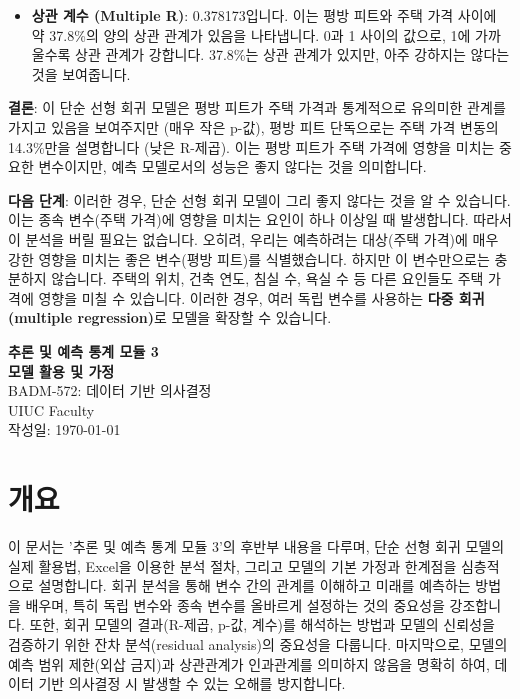 \documentclass[11pt,a4paper]{article}
\begin{document}
\begin{tcolorbox}[examplebox, title=Excel 실습: Zillow 주택 데이터]
\begin{itemize}
    \item \textbf{상관 계수 (Multiple R)}: 0.378173입니다. 이는 평방 피트와 주택 가격 사이에 약 37.8\%의 양의 상관 관계가 있음을 나타냅니다. 0과 1 사이의 값으로, 1에 가까울수록 상관 관계가 강합니다. 37.8\%는 상관 관계가 있지만, 아주 강하지는 않다는 것을 보여줍니다.
\end{itemize}

\textbf{결론}:
이 단순 선형 회귀 모델은 평방 피트가 주택 가격과 통계적으로 유의미한 관계를 가지고 있음을 보여주지만 (매우 작은 p-값), 평방 피트 단독으로는 주택 가격 변동의 14.3\%만을 설명합니다 (낮은 R-제곱). 이는 평방 피트가 주택 가격에 영향을 미치는 중요한 변수이지만, 예측 모델로서의 성능은 좋지 않다는 것을 의미합니다.

\textbf{다음 단계}:
이러한 경우, 단순 선형 회귀 모델이 그리 좋지 않다는 것을 알 수 있습니다. 이는 종속 변수(주택 가격)에 영향을 미치는 요인이 하나 이상일 때 발생합니다. 따라서 이 분석을 버릴 필요는 없습니다. 오히려, 우리는 예측하려는 대상(주택 가격)에 매우 강한 영향을 미치는 좋은 변수(평방 피트)를 식별했습니다. 하지만 이 변수만으로는 충분하지 않습니다. 주택의 위치, 건축 연도, 침실 수, 욕실 수 등 다른 요인들도 주택 가격에 영향을 미칠 수 있습니다. 이러한 경우, 여러 독립 변수를 사용하는 \textbf{다중 회귀(multiple regression)}로 모델을 확장할 수 있습니다.
\end{tcolorbox}

\newpage

\begin{titlepage}
    \centering
    \vspace*{1cm}
    {\Huge\bfseries 추론 및 예측 통계 모듈 3}\\[1cm]
    {\Large\bfseries 모델 활용 및 가정}\\[0.5cm]
    {\Large BADM-572: 데이터 기반 의사결정}\\[2cm]
    {\Large UIUC Faculty}\\[0.5cm]
    {\large 작성일: \today}\\[3cm]
    \vfill
\end{titlepage}

\newpage
\tableofcontents
\newpage

\section*{개요}
이 문서는 '추론 및 예측 통계 모듈 3'의 후반부 내용을 다루며, 단순 선형 회귀 모델의 실제 활용법, Excel을 이용한 분석 절차, 그리고 모델의 기본 가정과 한계점을 심층적으로 설명합니다. 회귀 분석을 통해 변수 간의 관계를 이해하고 미래를 예측하는 방법을 배우며, 특히 독립 변수와 종속 변수를 올바르게 설정하는 것의 중요성을 강조합니다. 또한, 회귀 모델의 결과(R-제곱, p-값, 계수)를 해석하는 방법과 모델의 신뢰성을 검증하기 위한 잔차 분석(residual analysis)의 중요성을 다룹니다. 마지막으로, 모델의 예측 범위 제한(외삽 금지)과 상관관계가 인과관계를 의미하지 않음을 명확히 하여, 데이터 기반 의사결정 시 발생할 수 있는 오해를 방지합니다.
\end{document}
